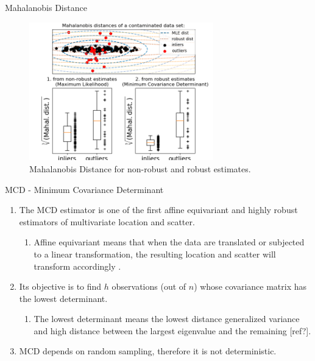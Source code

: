 \documentclass[newPxFont, numfooter, sectionpages]{beamer}
\begin{document}
\begin{frame}[c]{Mahalanobis Distance}
	\begin{figure}[h!]
	     \centering
	     \includegraphics[width=8cm]{figures/mahalanobis_distances01.png}
	     \caption{Mahalanobis Distance for non-robust and robust estimates.}
	     \label{fig:fig05}
	\end{figure}
\end{frame}

\begin{frame}[c]{MCD - Minimum Covariance Determinant}
	\begin{enumerate}
		\item The MCD estimator is one of the first affine equivariant and highly robust estimators of multivariate location and scatter.
		\begin{enumerate}
			\item Affine equivariant means that when the data are translated or subjected to a linear transformation, the resulting location and scatter will transform accordingly \cite{rousseeuw1984least,rousseeuw1999fast}.
		\end{enumerate}
		\item Its objective is to find $h$ observations (out of $n$) whose covariance matrix has the lowest determinant.
		\begin{enumerate}
			\item The lowest determinant means the lowest distance generalized variance and high distance between the largest eigenvalue and the remaining [ref?].
		\end{enumerate}
		\item MCD depends on random sampling, therefore it is not deterministic.
	\end{enumerate}
\end{frame}
\end{document}
